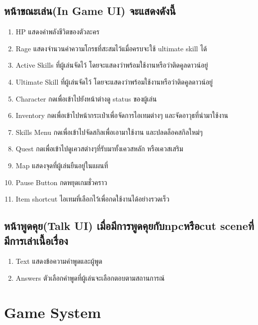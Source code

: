 \subsection{หน้าขณะเล่น(In Game UI) จะแสดงดังนี้}
\begin{enumerate}
  \item HP แสดงค่าพลังชีวิตของตัวละคร
  \item Rage แสดงจำนวนค่าความโกรธที่สะสมไว้แมื่อครบจะใช้ ultimate skill ได้
  \item Active Skills ที่ผู้เล่นจัดไว้ โดยจะแสดงว่าพร้อมใช้งานหรือว่าติดคูลดาวน์อยู่
  \item Ultimate Skill ที่ผู้เล่นจัดไว้ โดยจะแสดงว่าพร้อมใช้งานหรือว่าติดคูลดาวน์อยู่
  \item Character กดเพื่อเข้าไปยังหน้าต่างดู status ของผู้เล่น
  \item Inventory กดเพื่อเข้าไปหน้ากระเป๋าเพื่อจัดการไอเทมต่างๆ และจัดอาวุธที่นำมาใช้งาน
  \item Skills Menu กดเพื่อเข้าไปจัดสกิลเพื่อเอามาใช้งาน และปลดล็อคสกิลใหม่ๆ
  \item Quest กดเพื่อเข้าไปดูเควสต่างๆที่รับมาทั้งเควสหลัก หรือเควสเสริม
  \item Map แสดงจุดที่ผู้เล่นยืนอยู่ในแผนที่
  \item Pause Button กดหยุดเกมชั่วคราว
  \item Item shortcut ไอเทมที่เลือกไว้เพื่อกดใช้งานได้อย่างรวดเร็ว
\end{enumerate}

\subsection{หน้าพูดคุย(Talk UI) เมื่อมีการพูดคุยกับnpcหรือcut sceneที่มีการเล่าเนื้อเรื่อง}
\begin{enumerate}
\item Text แสดงข้อความคำพูดและผู้พูด
\item Answers ตัวเลือกคำพูดที่ผู้เล่นจะเลือกตอบตามสถานการณ์ 
\end{enumerate}

\section{Game System}

